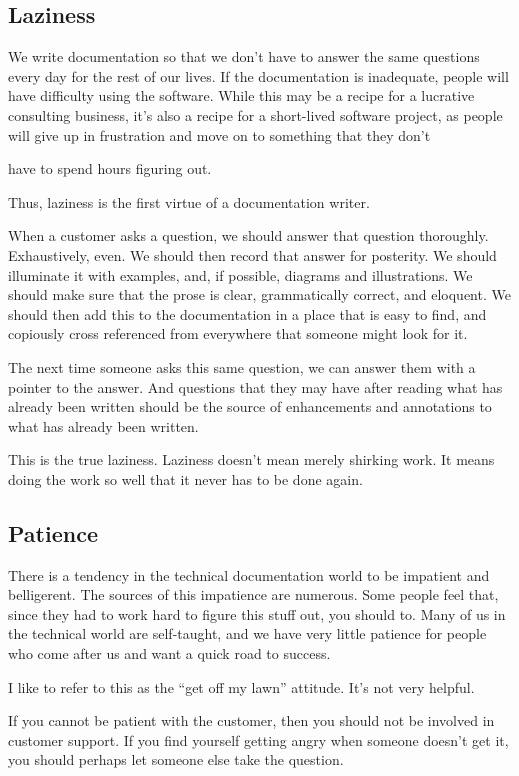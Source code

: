 \subsection*{Laziness}

We write documentation so that we don't have to answer the same questions every day for the rest of our lives. If the documentation is inadequate, people will have difficulty using the software. While this may be a recipe for a lucrative consulting business, it's also a recipe for a short-lived software project, as people will give up in frustration and move on to something that they don't 

have to spend hours figuring out.

Thus, laziness is the first virtue of a documentation writer.

When a customer asks a question, we should answer that question thoroughly. Exhaustively, even. We should then record that answer for posterity. We should illuminate it with examples, and, if possible, diagrams and illustrations. We should make sure that the prose is clear,
grammatically correct, and eloquent. We should then add this to the documentation in a place that is easy to find, and copiously cross referenced from everywhere that someone might look for it.

The next time someone asks this same question, we can answer them with a pointer to the answer. And questions that they may have after reading what has already been written should be the source of enhancements and annotations to what has already been written.

This is the true laziness. Laziness doesn't mean merely shirking work. It means doing the work so well that it never has to be done again.

\subsection*{Patience}
There is a tendency in the technical documentation world to be impatient and belligerent. The sources of this impatience are numerous. Some people feel that, since they had to work hard to figure this stuff out, you should to. Many of us in the technical world are self-taught, and we have very little patience for people who come after us and want a quick road to success.

I like to refer to this as the “get off my lawn” attitude. It’s not very helpful.

If you cannot be patient with the customer, then you should not be involved in customer support. If you find yourself getting angry when someone doesn’t get it, you should perhaps let someone else take the question.

